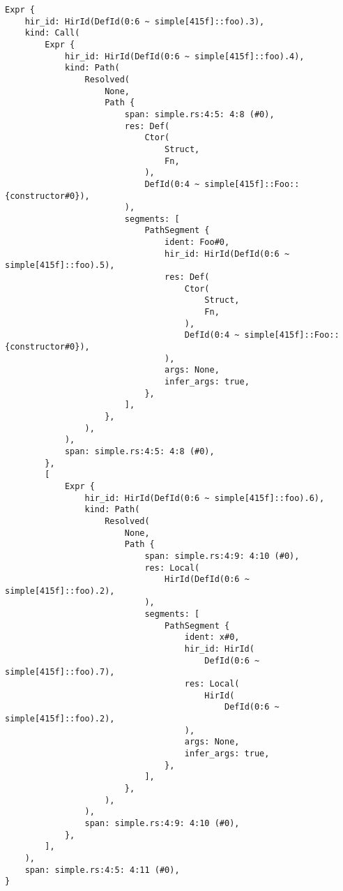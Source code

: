 \documentclass[
  11pt,
  twoside,symmetric]{report}
\begin{document}
\begin{verbatim}
Expr {
    hir_id: HirId(DefId(0:6 ~ simple[415f]::foo).3),
    kind: Call(
        Expr {
            hir_id: HirId(DefId(0:6 ~ simple[415f]::foo).4),
            kind: Path(
                Resolved(
                    None,
                    Path {
                        span: simple.rs:4:5: 4:8 (#0),
                        res: Def(
                            Ctor(
                                Struct,
                                Fn,
                            ),
                            DefId(0:4 ~ simple[415f]::Foo::{constructor#0}),
                        ),
                        segments: [
                            PathSegment {
                                ident: Foo#0,
                                hir_id: HirId(DefId(0:6 ~ simple[415f]::foo).5),
                                res: Def(
                                    Ctor(
                                        Struct,
                                        Fn,
                                    ),
                                    DefId(0:4 ~ simple[415f]::Foo::{constructor#0}),
                                ),
                                args: None,
                                infer_args: true,
                            },
                        ],
                    },
                ),
            ),
            span: simple.rs:4:5: 4:8 (#0),
        },
        [
            Expr {
                hir_id: HirId(DefId(0:6 ~ simple[415f]::foo).6),
                kind: Path(
                    Resolved(
                        None,
                        Path {
                            span: simple.rs:4:9: 4:10 (#0),
                            res: Local(
                                HirId(DefId(0:6 ~ simple[415f]::foo).2),
                            ),
                            segments: [
                                PathSegment {
                                    ident: x#0,
                                    hir_id: HirId(
                                        DefId(0:6 ~ simple[415f]::foo).7),
                                    res: Local(
                                        HirId(
                                            DefId(0:6 ~ simple[415f]::foo).2),
                                    ),
                                    args: None,
                                    infer_args: true,
                                },
                            ],
                        },
                    ),
                ),
                span: simple.rs:4:9: 4:10 (#0),
            },
        ],
    ),
    span: simple.rs:4:5: 4:11 (#0),
}
\end{verbatim}
\end{document}
